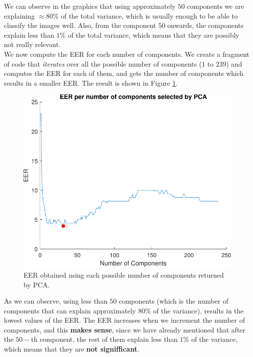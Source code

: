 \documentclass[a4paper]{article}
\begin{document}
We can observe in the graphics that using approximately \(50\) components we are explaining \(\approx 80\%\) of the total variance, which is usually enough to be able to classify the images well. Also, from the component \(50\) onwards, the components explain less than \(1\%\) of the total variance, which means that they are possibly not really relevant.\\

We now compute the EER for each number of components. We create a fragment of code that \emph{iterates} over all the possible number of components (\(1\) to \(239\)) and computes the EER for each of them, and gets the number of components which results in a smaller EER. The result is shown in Figure \ref{fig:ex2c}.


\begin{figure}[H]
  \centering
  \includegraphics[scale=0.7]{Figures/ERR-per-ncomponents}
    \caption{EER obtained using each possible number of components returned by PCA.}
    \label{fig:ex2c}
\end{figure}


As we can observe, using less than \(50\) components (which is the number of components that can explain approximately \(80\%\) of the variance), results in the lowest values of the EER. The EER increases when we increment the number of components, and this \textbf{makes sense}, since we have already mentioned that after the \(50-\)th component, the rest of them explain less than \(1\%\) of the variance, which means that they are \textbf{not signifficant}. \\
\end{document}
